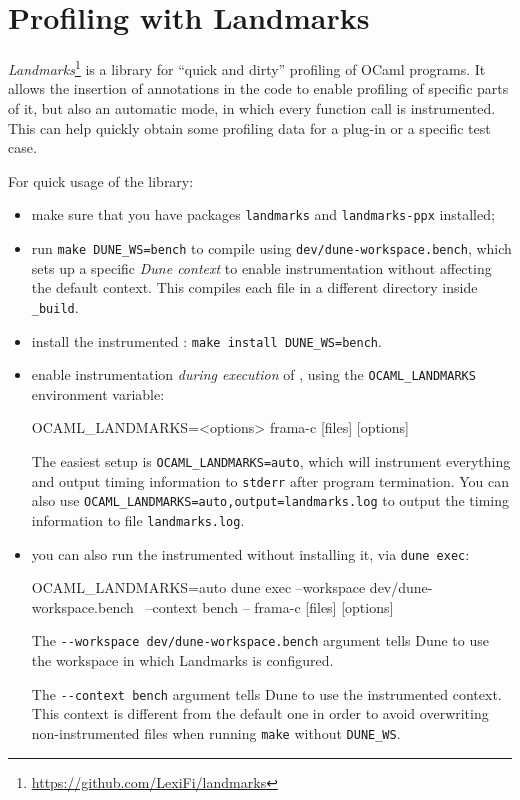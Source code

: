 \section{Profiling with Landmarks} \label{refman:landmarks}

{\em Landmarks}\footnote{\url{https://github.com/LexiFi/landmarks}} is a
library for ``quick and dirty'' profiling of OCaml programs. It allows the
insertion of annotations in the code to enable profiling of specific parts of
it, but also an automatic mode, in which every function call is instrumented.
This can help quickly obtain some profiling data for a plug-in or a specific
test case.

For quick usage of the library:
\begin{itemize}
\item make sure that you have packages \texttt{landmarks} and
  \texttt{landmarks-ppx} installed;
\item run \texttt{make DUNE\_WS=bench} to compile \framac using
  \texttt{dev/dune-workspace.bench}, which sets up a specific {\em Dune context}
  to enable instrumentation without affecting the default context.
  This compiles each \framac file in a different directory inside
  \texttt{\_build}.
\item install the instrumented \framac: \texttt{make install DUNE\_WS=bench}.
\item enable instrumentation {\em during execution} of \framac, using the
  \texttt{OCAML\_LANDMARKS} environment variable:
\begin{logs}
OCAML_LANDMARKS=<options> frama-c [files] [options]
\end{logs}
  The easiest setup is \texttt{OCAML\_LANDMARKS=auto}, which will instrument
  everything and output timing information to \texttt{stderr} after
  program termination.
  You can also use \texttt{OCAML\_LANDMARKS=auto,output=landmarks.log} to
  output the timing information to file \texttt{landmarks.log}.
\item you can also run the instrumented \framac without installing it, via
  \texttt{dune exec}:
\begin{logs}
OCAML_LANDMARKS=auto dune exec --workspace dev/dune-workspace.bench \
  --context bench -- frama-c [files] [options]
\end{logs}
  The \verb+--workspace dev/dune-workspace.bench+ argument tells Dune to use
  the workspace in which Landmarks is configured.

  The \verb+--context bench+ argument tells Dune to use the instrumented
  context. This context is different from the default one in order to avoid
  overwriting non-instrumented files when running \texttt{make} without
  \texttt{DUNE\_WS}.
\end{itemize}

